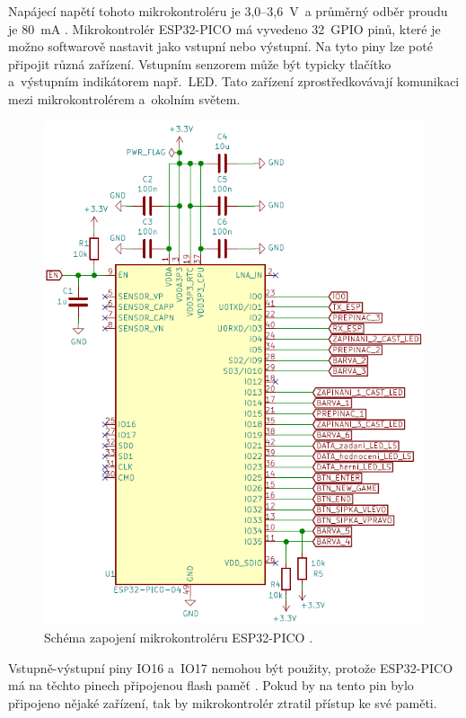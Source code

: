   Napájecí napětí tohoto mikrokontroléru je 3,0--3,6~V~a průměrný odběr proudu je 80~mA \cite{PICO_datasheet}. Mikrokontrolér ESP32-PICO má 
  vyvedeno 32~GPIO pinů, které je 
  možno softwarově nastavit jako vstupní nebo výstupní. Na tyto piny lze poté připojit různá zařízení. Vstupním senzorem může 
  být typicky tlačítko a~výstupním indikátorem např.~LED. Tato zařízení zprostředkovávají komunikaci mezi mikrokontrolérem a~okolním 
  světem.

  \begin{figure}[!h]
    \begin{center}
      \includegraphics[scale=0.5]{obrazky/ESP32_PICO_schema.png}
    \end{center}
    \caption[Schéma zapojení mikrokontroléru ESP32-PICO \cite{PICO_datasheet}]{Schéma zapojení mikrokontroléru ESP32-PICO \cite{PICO_datasheet}.}
  \end{figure}

  Vstupně-výstupní piny IO16 a~IO17 nemohou být použity, protože ESP32-PICO má na těchto pinech připojenou flash paměť \cite{PICO_datasheet}.
  Pokud by na tento pin bylo připojeno nějaké zařízení, tak by mikrokontrolér ztratil přístup ke své paměti.

